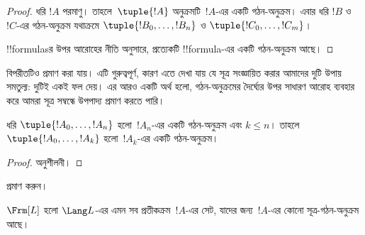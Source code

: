 \documentclass[../../../include/open-logic-section]{subfiles}
\begin{document}
\begin{proof}
ধরি $!A$ পরমাণু। তাহলে~$\tuple{!A}$ অনুক্রমটি~$!A$-এর একটি
গঠন-অনুক্রম।
%
এবার ধরি $!B$ ও~$!C$-এর গঠন-অনুক্রম যথাক্রমে
$\tuple{!B_0,\dotsc,!B_n}$ ও $\tuple{!C_0,\dotsc,!C_m}$।
%
\begin{enumerate}
\end{enumerate}
!!{formula}sর উপর আরোহের নীতি অনুসারে, প্রত্যেকটি !!{formula}-এর
একটি গঠন-অনুক্রম আছে।
\end{proof}

বিপরীতটিও প্রমাণ করা যায়। এটি গুরুত্বপূর্ণ, কারণ এতে দেখা যায় যে
সূত্র সংজ্ঞায়িত করার আমাদের দুটি উপায় সমতুল্য: দুটিই একই ফল দেয়।
এর আরও একটি অর্থ হলো, গঠন-অনুক্রমের দৈর্ঘ্যের উপর সাধারণ আরোহ ব্যবহার
করে আমরা সূত্র সম্বন্ধে উপপাদ্য প্রমাণ করতে পারি।

\begin{lem}
ধরি $\tuple{!A_0,\dotsc,!A_n}$ হলো~$!A_n$-এর একটি গঠন-অনুক্রম এবং
$k \leq n$। তাহলে $\tuple{!A_0,\dotsc,!A_k}$ হলো~$!A_k$-এর একটি
গঠন-অনুক্রম।
\end{lem}

\begin{proof}
অনুশীলনী।
\end{proof}

\begin{prob}
 প্রমাণ করুন।
\end{prob}

\begin{thm}
$\Frm[L]$ হলো $\Lang L$-এর এমন সব প্রতীকক্রম~$!A$-এর সেট,
যাদের জন্য~$!A$-এর কোনো সূত্র-গঠন-অনুক্রম আছে।
\end{thm}
\end{document}
